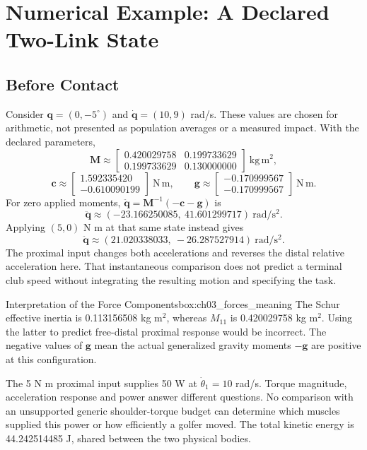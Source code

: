 \section{Numerical Example: A Declared Two-Link State}
\subsection*{Before Contact}
Consider $\bm q=(0,-5^\circ)$ and $\dot{\bm q}=(10,9)$ rad/s. These values are chosen for arithmetic, not presented as population averages or a measured impact. With the declared parameters,
\[
\bm M\approx\begin{bmatrix}0.420029758&0.199733629\\0.199733629&0.130000000\end{bmatrix}\ \mathrm{kg\,m^2},
\]
\[
\bm c\approx\begin{bmatrix}1.592335420\\-0.610090199\end{bmatrix}\ \mathrm{N\,m},\qquad
\bm g\approx\begin{bmatrix}-0.170999567\\-0.170999567\end{bmatrix}\ \mathrm{N\,m}.
\]
For zero applied moments, $\ddot{\bm q}=\bm M^{-1}(-\bm c-\bm g)$ is
\[
\ddot{\bm q}\approx(-23.166250085,\ 41.601299717)\ \mathrm{rad/s^2}.
\]
Applying $(5,0)$ N m at that same state instead gives
\[
\ddot{\bm q}\approx(21.020338033,\ -26.287527914)\ \mathrm{rad/s^2}.
\]
The proximal input changes both accelerations and reverses the distal relative acceleration here. That instantaneous comparison does not predict a terminal club speed without integrating the resulting motion and specifying the task.

\begin{laymansbox}{Interpretation of the Force Components}{box:ch03_forces_meaning}
The Schur effective inertia is 0.113156508 kg m$^2$, whereas $M_{11}$ is 0.420029758 kg m$^2$. Using the latter to predict free-distal proximal response would be incorrect. The negative values of $\bm g$ mean the actual generalized gravity moments $-\bm g$ are positive at this configuration.

The 5 N m proximal input supplies 50 W at $\dot\theta_1=10$ rad/s. Torque magnitude, acceleration response and power answer different questions. No comparison with an unsupported generic shoulder-torque budget can determine which muscles supplied this power or how efficiently a golfer moved. The total kinetic energy is 44.242514485 J, shared between the two physical bodies.
\end{laymansbox}

